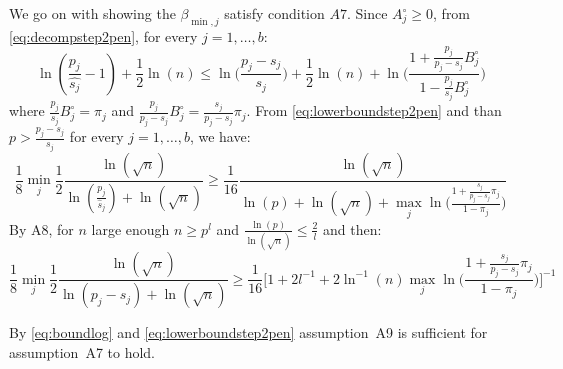 \documentclass[aos]{imsart}
\theoremstyle{plain}
\begin{document}
\begin{supplement}
We go on with showing the $\beta_{\min,j}$ satisfy condition $A7$. Since $A_j^{\circ} \geq 0$, from \eqref{eq:decompstep2pen}, for every $j=1,\ldots,b$:
\begin{equation}\label{eq:lowerboundstep2pen}
    \ln(\frac{p_j}{\hat{s_j}}-1) + \frac{1}{2}\ln(n) \leq \ln\big(\frac{p_j-s_j}{s_j}\big)+\frac{1}{2}\ln(n)+\ln\bigg(\frac{1+\frac{p_j}{p_j-s_j}B^{\circ}_j}{1-\frac{p_j}{s_j}B^{\circ}_j}\bigg)
\end{equation}
where $\frac{p_j}{s_j}B^{\circ}_j=\pi_j$ and  $\frac{p_j}{p_j-s_j}B^{\circ}_j=\frac{s_j}{p_j-s_j}\pi_j$. From \eqref{eq:lowerboundstep2pen} and than $p>\frac{p_j-s_j}{s_j}$ for every $j=1,\ldots,b$, we have:
\begin{equation*}
    \frac{1}{8}\min_j \frac{1}{2}\frac{\ln(\sqrt{n})}{\ln(\frac{p_j}{\widehat{s}_j})+\ln(\sqrt{n})}
\geq \frac{1}{16}\frac{\ln(\sqrt{n})}{\ln(p)+\ln(\sqrt{n})+\max_j\ln\bigg(\frac{1+\frac{s_j}{p_j-s_j}\pi_j}{1-
\pi_j}\bigg)}
\end{equation*}
By A8, for $n$ large enough $n\geq p^l$ and $\frac{\ln(p)}{\ln(\sqrt{n})}\leq \frac{2}{l}$ and then:
\begin{equation}\label{eq:boundlog}
    \frac{1}{8}\min_j \frac{1}{2}\frac{\ln(\sqrt{n})}{\ln(p_j-s_j)+\ln(\sqrt{n})}
\geq \frac{1}{16}\bigg[1+2l^{-1}+2\ln^{-1}(n)\max_j\ln\bigg(\frac{1+\frac{s_j}{p_j-s_j}\pi_j}{1-\pi_j}\bigg)\bigg]^{-1}
\end{equation}

By \eqref{eq:boundlog} and \eqref{eq:lowerboundstep2pen} assumption~A9 is sufficient for assumption~A7 to hold.





\end{supplement}
\end{document}
